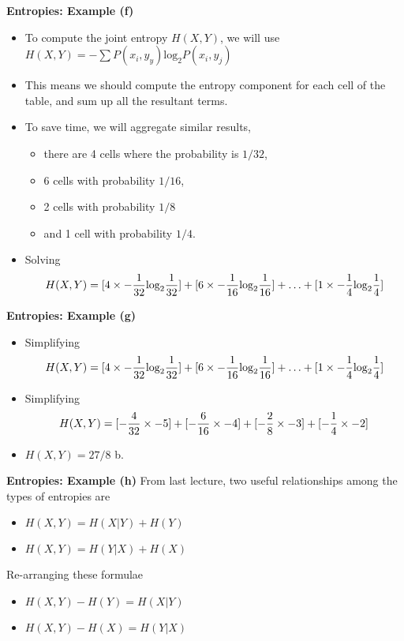 \medskip
\noindent \textbf{Entropies: Example (f)}
\begin{itemize}

\item To compute the joint entropy $H(X,Y)$,  we will use $H(X,Y) = -\sum P(x_i,y_y) \mbox{log}_2P(x_i,y_j)$
\bigskip
\item This means we should compute the entropy component for each cell of the table, and sum up all the resultant terms.
\bigskip
\item To save time, we will aggregate similar results, \begin{itemize} \item there are 4 cells where the probability is $1/32$,\item 6 cells with probability $1/16$, \item 2 cells with probability $1/8$ \item and 1 cell with probability $1/4$. \end{itemize}
\item Solving
\[ H(X,Y) = [4 \times -{1\over 32} \mbox{log}_2 {1\over 32} ] + [6 \times -{1\over 16} \mbox{log}_2 {1\over 16} ] + \ldots + [1 \times -{1\over 4} \mbox{log}_2 {1\over 4} ] \]
\end{itemize}


\medskip
\noindent \textbf{Entropies: Example (g)}
\begin{itemize}
\item Simplifying\[ H(X,Y) = [4 \times -{1\over 32} \mbox{log}_2 {1\over 32} ] + [6 \times -{1\over 16} \mbox{log}_2 {1\over 16} ] + \ldots + [1 \times -{1\over 4} \mbox{log}_2 {1\over 4} ] \]
\item Simplifying \[H(X,Y) = [-{4\over 32} \times -5 ] + [-{6\over 16} \times -4 ] + [-{2\over 8} \times -3 ] + [ -{1\over 4} \times -2]\]
\item $H(X,Y) = 27/8$ b.
\end{itemize}


\medskip
\noindent \textbf{Entropies: Example (h)}
From last lecture, two useful relationships among the types of entropies are
\begin{itemize}
\item $H(X,Y)=H(X|Y)+H(Y) $
\item $H(X,Y)=H(Y|X)+H(X) $
\end{itemize}
\bigskip
Re-arranging these formulae
\begin{itemize}
\item $H(X,Y)-H(Y) = H(X|Y) $
\item $H(X,Y)-H(X) = H(Y|X) $
\end{itemize}


